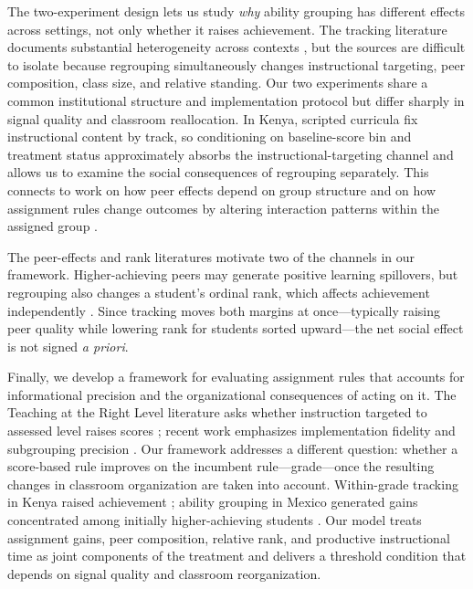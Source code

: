 \documentclass[11pt]{article}
\begin{document}
The two-experiment design lets us study \emph{why} ability grouping has different effects across settings, not only whether it raises achievement. The tracking literature documents substantial heterogeneity across contexts \citep{betts:2011,card2016can,vardardottir2013peer}, but the sources are difficult to isolate because regrouping simultaneously changes instructional targeting, peer composition, class size, and relative standing. Our two experiments share a common institutional structure and implementation protocol but differ sharply in signal quality and classroom reallocation. In Kenya, scripted curricula fix instructional content by track, so conditioning on baseline-score bin and treatment status approximately absorbs the instructional-targeting channel and allows us to examine the social consequences of regrouping separately. This connects to work on how peer effects depend on group structure \citep{hoxby2005taking,rjosk2022dispersion,vigdor2007peer} and on how assignment rules change outcomes by altering interaction patterns within the assigned group \citep{carrellsacerdotewest2013,garlick}.

The peer-effects and rank literatures motivate two of the channels in our framework. Higher-achieving peers may generate positive learning spillovers, but regrouping also changes a student's ordinal rank, which affects achievement independently \citep{murphy2020top,bertoninistico2023}. Since tracking moves both margins at once---typically raising peer quality while lowering rank for students sorted upward---the net social effect is not signed \emph{a priori}.

Finally, we develop a framework for evaluating assignment rules that accounts for informational precision and the organizational consequences of acting on it. The Teaching at the Right Level literature asks whether instruction targeted to assessed level raises scores \citep{banerjee2017proof,duflo2020experimental}; recent work emphasizes implementation fidelity and subgrouping precision \citep{angristmeager2023}. Our framework addresses a different question: whether a score-based rule improves on the incumbent rule---grade---once the resulting changes in classroom organization are taken into account. Within-grade tracking in Kenya raised achievement \citep{duflo2011peer}; ability grouping in Mexico generated gains concentrated among initially higher-achieving students \citep{bussofrisancho2023}. Our model treats assignment gains, peer composition, relative rank, and productive instructional time as joint components of the treatment and delivers a threshold condition that depends on signal quality and classroom reorganization. 
\end{document}
